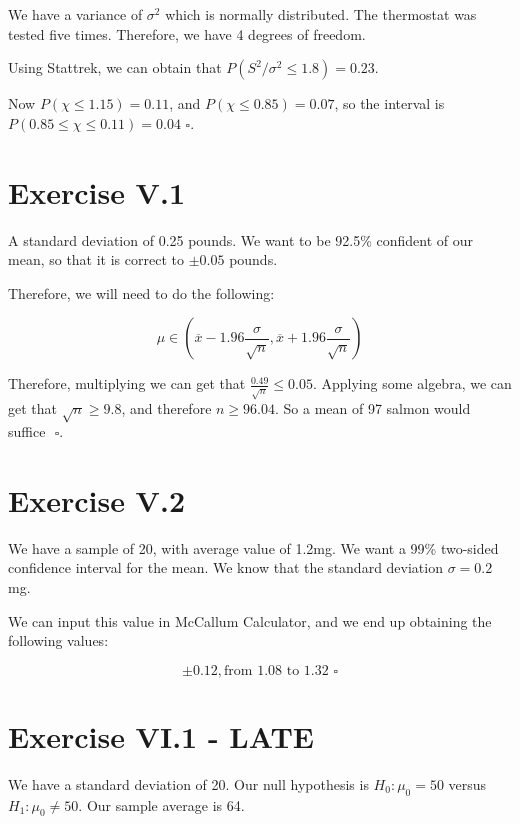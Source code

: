 \documentclass[titlepage, letterpaper]{article}
\newcommand{\qed}{\,\,\square}
\begin{document}

We have a variance of $\sigma^2$ which is normally distributed.
The thermostat was tested five times.
Therefore, we have 4 degrees of freedom.

Using Stattrek, we can obtain that $P(S^2/\sigma^2 \leq 1.8) = 0.23$.

Now $P(\chi \leq 1.15) = 0.11$, and $P(\chi \leq 0.85) = 0.07$, so the interval is $P(0.85 \leq \chi \leq 0.11) = 0.04\qed$.

\section{Exercise V.1} %
\label{sec:exercive_v_1}

A standard deviation of 0.25 pounds.
We want to be 92.5\% confident of our mean, so that it is correct to $\pm 0.05$ pounds.

Therefore, we will need to do the following:

$$\mu \in \left(\overline{x} - 1.96\frac{\sigma}{\sqrt{n}}, \overline{x} + 1.96\frac{\sigma}{\sqrt{n}} \right)$$

Therefore, multiplying we can get that $\frac{0.49}{\sqrt{n}} \leq 0.05$. Applying some algebra, we can get that $\sqrt{n} \geq 9.8$, and therefore $n \geq 96.04$. So a mean of 97 salmon would suffice $\qed$.

\section{Exercise V.2} %
\label{sec:exercise_v_2}

We have a sample of 20, with average value of 1.2mg.
We want a 99\% two-sided confidence interval for the mean.
We know that the standard deviation $\sigma = 0.2$mg.

We can input this value in McCallum Calculator, and we end up obtaining the following values:

$$\pm 0.12, \text{from } 1.08 \text{ to } 1.32 \qed$$


\section{Exercise VI.1 - LATE} %
\label{sec:exercise_vi_1}

We have a standard deviation of 20.
Our null hypothesis is $H_0 \colon \mu_0 = 50$ versus $H_1 \colon \mu_0 \not = 50$.
Our sample average is 64.
\end{document}
